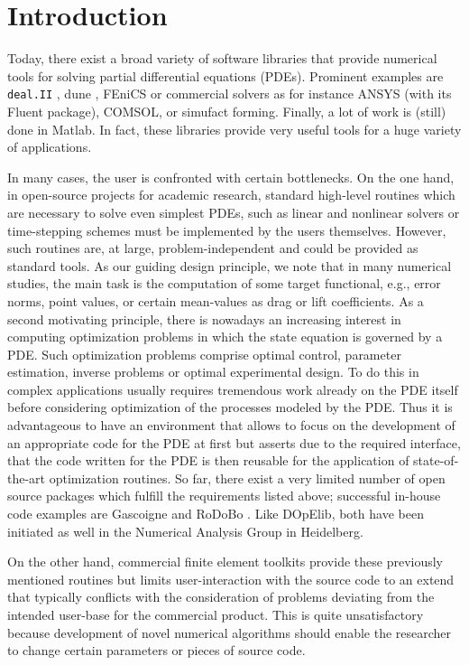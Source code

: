 \documentclass[smallextended]{svjour3}       %
\numberwithin{equation}{section}
\newcommand{\deal}{\texttt{deal.II}}
\begin{document}
\section{Introduction}
\label{introduction}
Today, there exist a broad variety of software libraries
that provide numerical tools for solving partial differential
equations (PDEs). Prominent examples are 
\deal{} \citep{dealnew}, dune \citep{dune}, 
FEniCS \citep{fenics}
or commercial solvers as for instance ANSYS (with its Fluent package),
COMSOL, or simufact forming.
Finally, a lot of work is (still) done in Matlab.
In fact, these libraries provide very useful tools 
for a huge variety of applications. 

In many cases, the user is confronted with 
certain bottlenecks. On the one hand, 
in open-source projects for academic research, 
standard high-level routines 
which are necessary to solve even simplest PDEs,
such as linear and nonlinear solvers or time-stepping schemes must be implemented 
by the users themselves. However, such routines are, at large,
problem-independent and could be provided as standard tools. 
As our guiding design principle, we note that in many 
numerical studies, the main task is the computation of some  
target functional, e.g., error norms,
point values, or certain mean-values as drag or lift coefficients.
As a second motivating principle, 
there is nowadays an increasing interest in computing 
optimization problems in which the state equation is governed 
by a PDE. Such optimization problems comprise optimal control,
parameter estimation, inverse problems or optimal experimental design. 
To do this in complex applications usually requires tremendous work already
on the PDE itself before considering optimization of the processes modeled 
by the PDE. Thus it is advantageous to have an environment that allows to 
focus on the development of an appropriate code for the PDE at first but 
asserts due to the required interface, that the code written for the PDE
is then reusable for the application of state-of-the-art optimization 
routines.
So far, there exist a very limited number of open source packages
which fulfill the requirements listed above; 
successful in-house code examples are Gascoigne \cite{gascoigne}
and RoDoBo \cite{rodobo}. 
Like DOpElib, both have been initiated as well in 
the Numerical Analysis Group in Heidelberg.

On the other hand, commercial finite element toolkits provide these 
previously mentioned routines but limits user-interaction
with the source code to an extend that typically conflicts
with the consideration of problems deviating from the intended 
user-base for the commercial product. 
This is quite unsatisfactory because development of novel numerical 
algorithms should enable the researcher
to change certain parameters or pieces of source code. 
\end{document}
